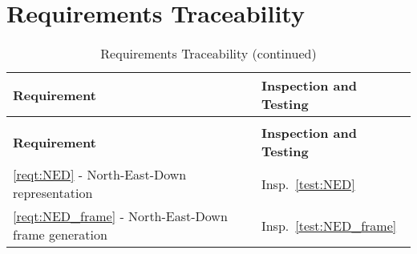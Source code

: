 \section{Requirements Traceability}

\begin{longtable}[c]{||p{3.5in}|p{3.5in}|}
\caption{Requirements Traceability} \\[6pt]
\hline
{\bf Requirement} & {\bf Inspection and Testing} \\ 
\hline \hline
\endfirsthead
\hline
\endfoot
\caption[]{Requirements Traceability (continued)} \\[6pt]
\hline
{\bf Requirement} & {\bf Inspection and Testing} \\ 
\hline \hline
\endhead
\ref{reqt:NED} - North-East-Down representation &
  Insp.~\ref{test:NED} \\ \hline
\ref{reqt:NED_frame} - North-East-Down frame generation &
  Insp.~\ref{test:NED_frame} \\ \hline

\end{longtable}
